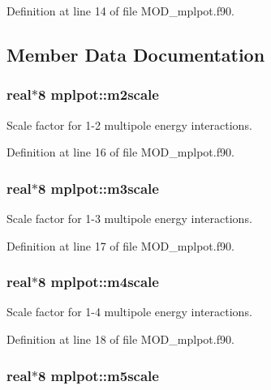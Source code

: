 Definition at line 14 of file M\-O\-D\-\_\-mplpot.\-f90.



\subsection{Member Data Documentation}
\hypertarget{classmplpot_a041f4f65d92047cafeb5342c4ec33f7d}{
\subsubsection[{m2scale}]{\setlength{\rightskip}{0pt plus 5cm}real$\ast$8 mplpot\-::m2scale}}\label{classmplpot_a041f4f65d92047cafeb5342c4ec33f7d}


Scale factor for 1-\/2 multipole energy interactions. 



Definition at line 16 of file M\-O\-D\-\_\-mplpot.\-f90.

\hypertarget{classmplpot_abb0c7e641014206b5361845ffdc10eae}{
\subsubsection[{m3scale}]{\setlength{\rightskip}{0pt plus 5cm}real$\ast$8 mplpot\-::m3scale}}\label{classmplpot_abb0c7e641014206b5361845ffdc10eae}


Scale factor for 1-\/3 multipole energy interactions. 



Definition at line 17 of file M\-O\-D\-\_\-mplpot.\-f90.

\hypertarget{classmplpot_ac98710d40643d7a17351a54a7eb339a6}{
\subsubsection[{m4scale}]{\setlength{\rightskip}{0pt plus 5cm}real$\ast$8 mplpot\-::m4scale}}\label{classmplpot_ac98710d40643d7a17351a54a7eb339a6}


Scale factor for 1-\/4 multipole energy interactions. 



Definition at line 18 of file M\-O\-D\-\_\-mplpot.\-f90.

\hypertarget{classmplpot_a4220981e046106273c4f663d172b6a64}{
\subsubsection[{m5scale}]{\setlength{\rightskip}{0pt plus 5cm}real$\ast$8 mplpot\-::m5scale}}\label{classmplpot_a4220981e046106273c4f663d172b6a64}


